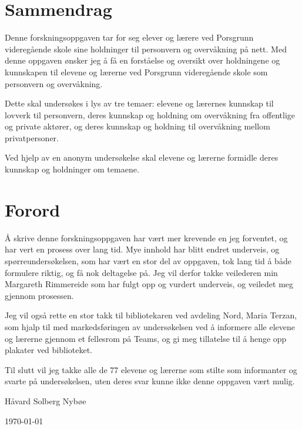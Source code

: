 \section*{Sammendrag}
Denne forskningsoppgaven tar for seg elever og lærere ved Porsgrunn videregående skole sine holdninger til personvern og overvåkning på nett. Med denne oppgaven ønsker jeg å få en forståelse og oversikt over holdningene og kunnskapen til elevene og lærerne ved Porsgrunn videregående skole som personvern og overvåkning. 

Dette skal undersøkes i lys av tre temaer: elevene og lærernes kunnskap til lovverk til personvern, deres kunnskap og holdning om overvåkning fra offentlige og private aktører, og deres kunnskap og holdning til overvåkning mellom privatpersoner.

Ved hjelp av en anonym undersøkelse skal elevene og lærerne formidle deres kunnskap og holdninger om temaene.

\section*{Forord}
Å skrive denne forskningsoppgaven har vært mer krevende en jeg forventet, og har vert en prosess over lang tid. Mye innhold har blitt endret underveis, og spørreundersøkelsen, som har vært en stor del av oppgaven, tok lang tid å både formulere riktig, og få nok deltagelse på. Jeg vil derfor takke veilederen min Margareth Rimmereide som har fulgt opp og vurdert underveis, og veiledet meg gjennom prosessen. 

Jeg vil også rette en stor takk til bibliotekaren ved avdeling Nord, Maria Terzan, som hjalp til med markedsføringen av undersøkelsen ved å informere alle elevene og lærerne gjennom et fellesrom på Teams, og gi meg tillatelse til å henge opp plakater ved biblioteket.

Til slutt vil jeg takke alle de 77 elevene og lærerne som stilte som informanter og svarte på undersøkelsen, uten deres svar kunne ikke denne oppgaven vært mulig.

\vfill

Håvard Solberg Nybøe

\today{}


\newpage